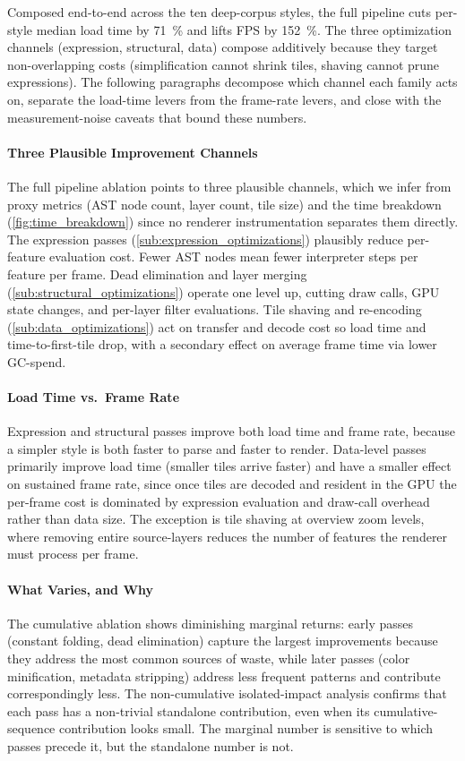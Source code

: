 Composed end-to-end across the ten deep-corpus styles, the full pipeline cuts per-style median load time by \qty{71}{\percent} and lifts \ac{FPS} by \qty{152}{\percent}.
The three optimization channels (expression, structural, data) compose additively because they target non-overlapping costs (simplification cannot shrink tiles, shaving cannot prune expressions).
The following paragraphs decompose which channel each family acts on, separate the load-time levers from the frame-rate levers, and close with the measurement-noise caveats that bound these numbers.

\paragraph{Three Plausible Improvement Channels}
The full pipeline ablation points to three plausible channels, which we infer from proxy metrics (\ac{AST} node count, layer count, tile size) and the time breakdown (\cref{fig:time_breakdown}) since no renderer instrumentation separates them directly.
The expression passes (\cref{sub:expression_optimizations}) plausibly reduce per-feature evaluation cost.
Fewer \ac{AST} nodes mean fewer interpreter steps per feature per frame.
Dead elimination and layer merging (\cref{sub:structural_optimizations}) operate one level up, cutting draw calls, \ac{GPU} state changes, and per-layer filter evaluations.
Tile shaving and re-encoding (\cref{sub:data_optimizations}) act on transfer and decode cost so load time and time-to-first-tile drop, with a secondary effect on average frame time via lower \ac{GC}-spend.

\paragraph{Load Time vs.\ Frame Rate}
Expression and structural passes improve both load time and frame rate, because a simpler style is both faster to parse and faster to render.
Data-level passes primarily improve load time (smaller tiles arrive faster) and have a smaller effect on sustained frame rate, since once tiles are decoded and resident in the \ac{GPU} the per-frame cost is dominated by expression evaluation and draw-call overhead rather than data size.
The exception is tile shaving at overview zoom levels, where removing entire source-layers reduces the number of features the renderer must process per frame.

\paragraph{What Varies, and Why}
The cumulative ablation shows diminishing marginal returns:
early passes (constant folding, dead elimination) capture the largest improvements because they address the most common sources of waste, while later passes (color minification, metadata stripping) address less frequent patterns and contribute correspondingly less.
The non-cumulative isolated-impact analysis confirms that each pass has a non-trivial standalone contribution, even when its cumulative-sequence contribution looks small.
The marginal number is sensitive to which passes precede it, but the standalone number is not.

